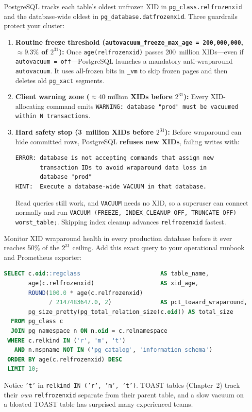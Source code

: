 PostgreSQL tracks each table's oldest unfrozen XID in \texttt{pg\_class.relfrozenxid} and the database-wide oldest in \texttt{pg\_database.datfrozenxid}. Three guardrails protect your cluster:
\begin{enumerate}
  \item \textbf{Routine freeze threshold (\texttt{autovacuum\_freeze\_max\_age = 200,000,000}, $\approx 9.3\%$ of $2^{31}$):} Once \texttt{age(relfrozenxid)} passes 200~million XIDs---even if \texttt{autovacuum = off}---PostgreSQL launches a mandatory anti-wraparound \texttt{autovacuum}. It uses all-frozen bits in \texttt{\_vm} to skip frozen pages and then deletes old \texttt{pg\_xact} segments.
  \item \textbf{Client warning zone ($\approx 40\text{ million}$ XIDs before $2^{31}$):} Every XID-allocating command emits \texttt{WARNING: database "prod" must be vacuumed within N transactions}.
  \item \textbf{Hard safety stop (3~million XIDs before $2^{31}$):} Before wraparound can hide committed rows, PostgreSQL \textbf{refuses new XIDs}, failing writes with:
\begin{lstlisting}[language=Plain]
ERROR: database is not accepting commands that assign new
       transaction IDs to avoid wraparound data loss in
       database "prod"
HINT:  Execute a database-wide VACUUM in that database.
\end{lstlisting}
  Read queries still work, and \texttt{VACUUM} needs no XID, so a superuser can connect normally and run \texttt{VACUUM (FREEZE, INDEX\_CLEANUP OFF, TRUNCATE OFF) worst\_table;}. Skipping index cleanup advances \texttt{relfrozenxid} fastest.
\end{enumerate}

\begin{labbox}
Monitor XID wraparound health in every production database before it ever reaches 50\% of the $2^{31}$ ceiling. Add this exact query to your operational runbook and Prometheus exporter:

\begin{lstlisting}[language=SQL]
SELECT c.oid::regclass                       AS table_name,
       age(c.relfrozenxid)                   AS xid_age,
       ROUND(100.0 * age(c.relfrozenxid)
             / 2147483647.0, 2)              AS pct_toward_wraparound,
       pg_size_pretty(pg_total_relation_size(c.oid)) AS total_size
  FROM pg_class c
  JOIN pg_namespace n ON n.oid = c.relnamespace
 WHERE c.relkind IN ('r', 'm', 't')
   AND n.nspname NOT IN ('pg_catalog', 'information_schema')
 ORDER BY age(c.relfrozenxid) DESC
 LIMIT 10;
\end{lstlisting}

Notice \texttt{'t'} in \texttt{relkind IN ('r', 'm', 't')}. TOAST tables (Chapter~2) track their \emph{own} \texttt{relfrozenxid} separate from their parent table, and a slow vacuum on a bloated TOAST table has surprised many experienced teams.
\end{labbox}

